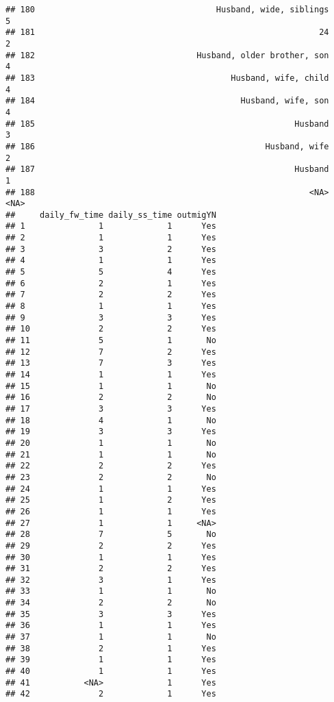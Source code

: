 \documentclass[
]{article}
\begin{document}
\begin{verbatim}
## 180                                     Husband, wide, siblings             5
## 181                                                          24             2
## 182                                 Husband, older brother, son             4
## 183                                        Husband, wife, child             4
## 184                                          Husband, wife, son             4
## 185                                                     Husband             3
## 186                                               Husband, wife             2
## 187                                                     Husband             1
## 188                                                        <NA>          <NA>
##     daily_fw_time daily_ss_time outmigYN
## 1               1             1      Yes
## 2               1             1      Yes
## 3               3             2      Yes
## 4               1             1      Yes
## 5               5             4      Yes
## 6               2             1      Yes
## 7               2             2      Yes
## 8               1             1      Yes
## 9               3             3      Yes
## 10              2             2      Yes
## 11              5             1       No
## 12              7             2      Yes
## 13              7             3      Yes
## 14              1             1      Yes
## 15              1             1       No
## 16              2             2       No
## 17              3             3      Yes
## 18              4             1       No
## 19              3             3      Yes
## 20              1             1       No
## 21              1             1       No
## 22              2             2      Yes
## 23              2             2       No
## 24              1             1      Yes
## 25              1             2      Yes
## 26              1             1      Yes
## 27              1             1     <NA>
## 28              7             5       No
## 29              2             2      Yes
## 30              1             1      Yes
## 31              2             2      Yes
## 32              3             1      Yes
## 33              1             1       No
## 34              2             2       No
## 35              3             3      Yes
## 36              1             1      Yes
## 37              1             1       No
## 38              2             1      Yes
## 39              1             1      Yes
## 40              1             1      Yes
## 41           <NA>             1      Yes
## 42              2             1      Yes

\end{verbatim}
\end{document}
